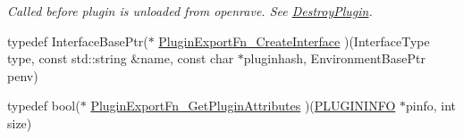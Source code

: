\begin{DoxyCompactItemize}
\begin{DoxyCompactList}\small\item\em Called before plugin is unloaded from openrave. See \hyperlink{group__plugin__exports_gad6773d91dae37d0ba9de59d2a05277e4}{DestroyPlugin}. \item\end{DoxyCompactList}\item 
typedef InterfaceBasePtr($\ast$ \hyperlink{namespaceOpenRAVE_afd22dd103475de7006afbd1511a60ac4}{PluginExportFn\_\-CreateInterface} )(InterfaceType type, const std::string \&name, const char $\ast$pluginhash, EnvironmentBasePtr penv)
\item 
typedef bool($\ast$ \hyperlink{namespaceOpenRAVE_a79dd40a56ad2aaee2fbb678a709e2572}{PluginExportFn\_\-GetPluginAttributes} )(\hyperlink{classOpenRAVE_1_1PLUGININFO}{PLUGININFO} $\ast$pinfo, int size)
\end{DoxyCompactItemize}
